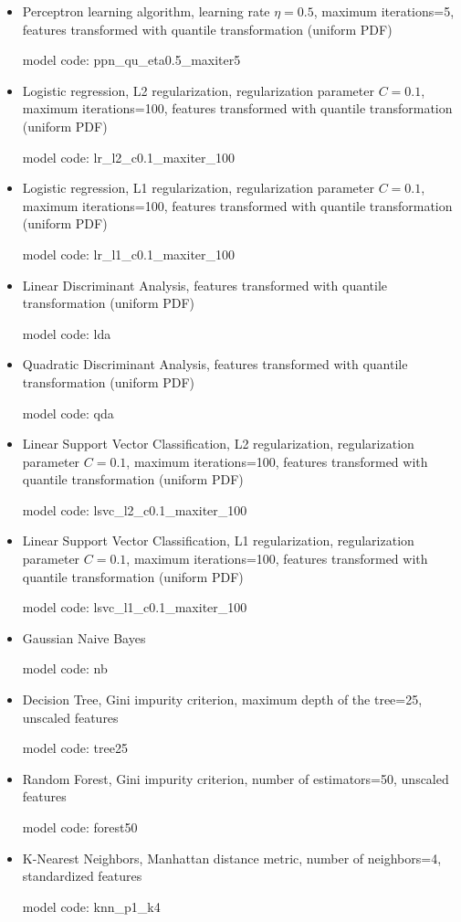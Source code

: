 \begin{itemize}
    \item Perceptron learning algorithm, learning rate $\eta=0.5$, maximum iterations=5, features transformed with quantile transformation (uniform PDF)

    model code: ppn\_qu\_eta0.5\_maxiter5

    \item Logistic regression, L2 regularization, regularization parameter $C=0.1$, maximum iterations=100, features transformed with quantile transformation (uniform PDF)

    model code: lr\_l2\_c0.1\_maxiter\_100

    \item Logistic regression, L1 regularization, regularization parameter $C=0.1$, maximum iterations=100, features transformed with quantile transformation (uniform PDF)

    model code: lr\_l1\_c0.1\_maxiter\_100

    \item Linear Discriminant Analysis, features transformed with quantile transformation (uniform PDF)

    model code: lda

    \item Quadratic Discriminant Analysis, features transformed with quantile transformation (uniform PDF)

    model code: qda

    \item Linear Support Vector Classification, L2 regularization, regularization parameter $C=0.1$, maximum iterations=100, features transformed with quantile transformation (uniform PDF)

    model code: lsvc\_l2\_c0.1\_maxiter\_100

    \item Linear Support Vector Classification, L1 regularization, regularization parameter $C=0.1$, maximum iterations=100, features transformed with quantile transformation (uniform PDF)

    model code: lsvc\_l1\_c0.1\_maxiter\_100

    \item Gaussian Naive Bayes

    model code: nb

    \item Decision Tree, Gini impurity criterion, maximum depth of the tree=25, unscaled features

    model code: tree25

    \item Random Forest, Gini impurity criterion, number of estimators=50, unscaled features

    model code: forest50

    \item K-Nearest Neighbors, Manhattan distance metric, number of neighbors=4, standardized features

    model code: knn\_p1\_k4
\end{itemize}

